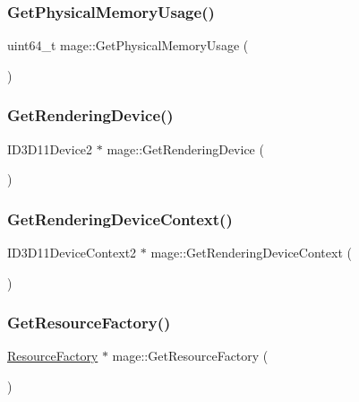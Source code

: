 \subsubsection{\texorpdfstring{Get\+Physical\+Memory\+Usage()}{GetPhysicalMemoryUsage()}}
{\footnotesize\ttfamily uint64\+\_\+t mage\+::\+Get\+Physical\+Memory\+Usage (\begin{DoxyParamCaption}{ }\end{DoxyParamCaption})}

\hypertarget{namespacemage_a30c7feb10b2be75bbce6d9c3739899c6}{}\label{namespacemage_a30c7feb10b2be75bbce6d9c3739899c6} 
\subsubsection{\texorpdfstring{Get\+Rendering\+Device()}{GetRenderingDevice()}}
{\footnotesize\ttfamily I\+D3\+D11\+Device2 $\ast$ mage\+::\+Get\+Rendering\+Device (\begin{DoxyParamCaption}{ }\end{DoxyParamCaption})}

\hypertarget{namespacemage_a55d3eaa7476e19ec8969e27d69249d95}{}\label{namespacemage_a55d3eaa7476e19ec8969e27d69249d95} 
\subsubsection{\texorpdfstring{Get\+Rendering\+Device\+Context()}{GetRenderingDeviceContext()}}
{\footnotesize\ttfamily I\+D3\+D11\+Device\+Context2 $\ast$ mage\+::\+Get\+Rendering\+Device\+Context (\begin{DoxyParamCaption}{ }\end{DoxyParamCaption})}

\hypertarget{namespacemage_a36a7338e52586e714ef646dea200a115}{}\label{namespacemage_a36a7338e52586e714ef646dea200a115} 
\subsubsection{\texorpdfstring{Get\+Resource\+Factory()}{GetResourceFactory()}}
{\footnotesize\ttfamily \hyperlink{classmage_1_1_resource_factory}{Resource\+Factory} $\ast$ mage\+::\+Get\+Resource\+Factory (\begin{DoxyParamCaption}{ }\end{DoxyParamCaption})}

